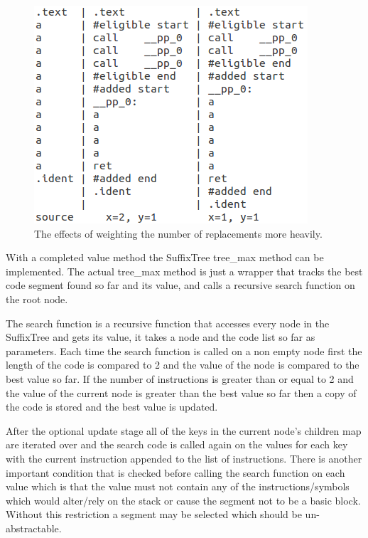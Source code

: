 \documentclass[9pt,nocopyrightspace]{sigplanconf}
\begin{document}
\begin{figure}
\begin{center}
\includegraphics[scale=.8]{weightex}
\caption{The effects of weighting the number of replacements more heavily.}
\end{center}
\end{figure}

With a completed value method the SuffixTree tree\_max method can be implemented.
The actual tree\_max method is just a wrapper that tracks the best code segment found so far and its value, and calls a recursive search function on the root node.

The search function is a recursive function that accesses every node in the SuffixTree and gets its value, it takes a node and the code list so far as parameters.
Each time the search function is called on a non empty node first the length of the code is compared to 2 and the value of the node is compared to the best value so far.
If the number of instructions is greater than or equal to 2 and the value of the current node is greater than the best value so far then a copy of the code is stored and the best value is updated.

After the optional update stage all of the keys in the current node's children map are iterated over and the search code is called again on the values for each key with the current instruction appended to the list of instructions.
There is another important condition that is checked before calling the search function on each value which is that the value must not contain any of the instructions/symbols which would alter/rely on the stack or cause the segment not to be a basic block.
Without this restriction a segment may be selected which should be un-abstractable.
\end{document}
